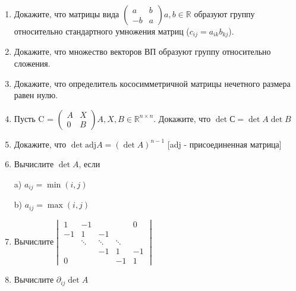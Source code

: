 \documentclass{article}
\begin{document}
 	\begin{enumerate}
 		\item Докажите, что матрицы вида  $\left(\begin{matrix}a & b\\ -b & a\end{matrix}\right) a,b \in \mathbb{R}$ образуют группу относительно стандартного умножения матриц ($c_{ij} = a_{ik} b_{kj}$).
 		\item Докажите, что множество векторов ВП образуют группу относительно сложения.
 		\item Докажите, что определитель кососимметричной матрицы нечетного размера равен нулю.
 		
 		\item Пусть C = $\left(\begin{matrix}A & X\\ 0 & B\end{matrix}\right) A,X, B \in \mathbb{R}^{n \times n}$. Докажите, что $\det С = \det A \det B$
 		
 		\item Докажите, что $\det \text{adj} A = (\det A)^{n-1}$ [adj - присоединенная матрица]
 		
 		\item Вычислите $\det A$, если
 		
 		a) $a_{ij} = \min(i,j)$
 		
 		b) $a_{ij} = \max(i,j)$ 
 		
 		\item Вычислите$ \begin{vmatrix}
 		1 & -1 &    &    & 0   \\
 		-1  & 1       & -1   &      &    \\
 		&       \ddots &           \ddots&     \ddots      &    \\
 		&         &           -1&          1 & -1\\
 		0  &         &           &          -1 & 1
 		\end{vmatrix}
 		$
 		
 		\item Вычислите $\partial_{ij} \det A$
 	\end{enumerate}
 	\newpage
\end{document}
